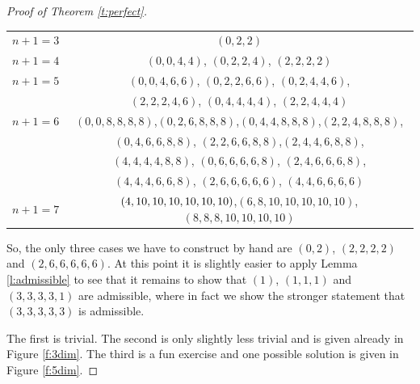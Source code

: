 \documentclass{article}
\begin{document}
\begin{proof}[Proof of Theorem \ref{t:perfect}]
\begin{center}
\begin{tabular}{ |c|c| } 
 \hline
 $n+1=3$ & \color{blue}$(0,2,2)$\color{black}  \\ 
 $n+1=4$ &  \color{blue}$(0,0,4,4)$\color{black}, \color{blue}$(0,2,2,4)$\color{black}, \color{red}$(2,2,2,2)$  \\ 
$n+1=5$ &  \color{blue}$(0,0,4,6,6)$\color{black}, \color{blue}$(0,2,2,6,6)$\color{black}, \color{blue}$(0,2,4,4,6)$\color{black},\\
& \color{blue}$(2,2,2,4,6)$\color{black}, \color{blue}$(0,4,4,4,4)$\color{black}, \color{blue}$(2,2,4,4,4)$ \color{black} \\ 
$n+1=6$ &  \color{blue}$(0,0,8,8,8,8)$\color{black},\color{blue}$(0,2,6,8,8,8)$\color{black},\color{blue}$(0,4,4,8,8,8)$\color{black},\color{blue}$(2,2,4,8,8,8)$\color{black}, \\
&\color{blue}$(0,4,6,6,8,8)$\color{black}, \color{blue}$(2,2,6,6,8,8)$\color{black},\color{blue}$(2,4,4,6,8,8)$\color{black},\\
& \color{blue}$(4,4,4,4,8,8)$\color{black},
\color{blue}$(0,6,6,6,6,8)$\color{black}, \color{blue}$(2,4,6,6,6,8)$, \\
& \color{blue}$(4,4,4,6,6,8)$\color{black},
\color{red}$(2,6,6,6,6,6)$\color{black}, \color{blue}$(4,4,6,6,6,6)$\color{black}\\ 
 $n+1=7$ &  \color{blue}$(4,10,10,10,10,10,10)\color{black}$,\color{blue}$(6,8,10,10,10,10,10)$\color{black},\color{blue}$(8,8,8,10,10,10,10)$\color{black}  \\ 
 \hline
\end{tabular}
\end{center}
So, the only three cases we have to construct by hand are $(0,2)$, $(2,2,2,2)$ and $(2,6,6,6,6,6)$. At this point it is slightly easier to apply Lemma \ref{l:admissible} to see that it remains to show that $(1)$, $(1,1,1)$ and $(3,3,3,3,1)$ are admissible, where in fact we show the stronger statement that $(3,3,3,3,3)$ is admissible.

The first is trivial. The second is only slightly less trivial and is given already in Figure \ref{f:3dim}. The third is a fun exercise and one possible solution is given in Figure \ref{f:5dim}.

\end{proof}
\end{document}

